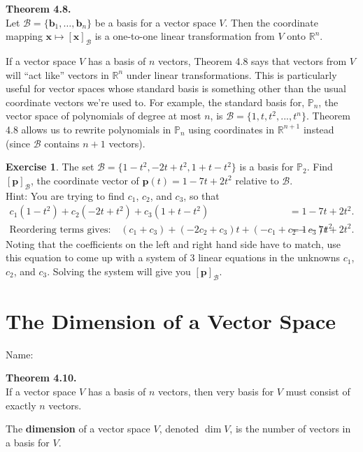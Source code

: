 \documentclass[10pt]{book}
\newcommand{\boxcolor}{gray!30}
\newenvironment{boxme}{\begin{mdframed}[backgroundcolor=\boxcolor,linewidth=0pt,nobreak=true]}{\end{mdframed}}
\newenvironment{boxthm}{\begin{mdframed}[backgroundcolor=\boxcolor,nobreak=true]}{\end{mdframed}}
\newenvironment{boxdef}{\begin{mdframed}[backgroundcolor=\boxcolor,linewidth=0pt,nobreak=true]}{\end{mdframed}}
\theoremstyle{definition}
\newtheorem{exercise}{Exercise}[section]
\newcommand{\name}[1][2.5in]{\vspace{-2.3em}\hfill Name: \underline{\hspace{#1}}}
\newcommand{\R}{\mathbb{R}}
\newcommand{\Poly}{\mathbb{P}}
\newcommand{\B}{\mathscr{B}}
\newcommand{\vect}[1]{\ensuremath{\boldsymbol{\mathbf{#1}}}}
\newcommand{\vectset}[3][v]{\{\vect{#1}_{#2},\ldots,\vect{#1}_{#3}\}}
\newcommand{\vectB}[1][x]{[\vect{#1}]_\B}
\begin{document}
\begin{boxthm}
	\textbf{Theorem 4.8.} \\
	Let $\B=\vectset[b]{1}{n}$ be a basis for a vector space $V$. Then the coordinate mapping $\vect{x}\mapsto\vectB$ is a one-to-one linear transformation from $V$ onto $\R^n$.
\end{boxthm}
\vspace{-1em}
\begin{boxme}
	If a vector space $V$ has a basis of $n$ vectors, Theorem 4.8 says that vectors from $V$ will ``act like'' vectors in $\R^n$ under linear transformations. This is particularly useful for vector spaces whose standard basis is something other than the usual coordinate vectors we're used to. For example, the standard basis for, $\Poly_n$, the vector space of polynomials of degree at most $n$, is $\B=\{1,t,t^2,...,t^n\}$. Theorem 4.8 allows us to rewrite polynomials in $\Poly_n$ using coordinates in $\R^{n+1}$ instead (since $\B$ contains $n+1$ vectors).
\end{boxme}
\begin{exercise} %
	The set $\B=\{ 1-t^2, -2t+t^2, 1+t-t^2 \}$ is a basis for $\Poly_2$. Find $\vectB[p]$, the coordinate vector of $\vect{p}(t)=1-7t+2t^2$ relative to $\B$. \\

	Hint: You are trying to find $c_1$, $c_2$, and $c_3$, so that
	\begin{align*}
	c_1(1-t^2)+c_2(-2t+t^2)+c_3(1+t-t^2) &= 1-7t+2t^2. \\
	\text{Reordering terms gives:}\quad
	(c_1+c_3) + (-2c_2+c_3)t + (-c_1+c_2-c_3)t^2 &= 1-7t+2t^2.
	\end{align*}
	Noting that the coefficients on the left and right hand side have to match, use this equation to come up with a system of 3 linear equations in the unknowns $c_1$, $c_2$, and $c_3$. Solving the system will give you $\vectB[p]$.
\end{exercise}
\vfill


\newpage


\section{The Dimension of a Vector Space}
\name[2in]


\begin{boxthm}
	\textbf{Theorem 4.10.} \\
	If a vector space $V$ has a basis of $n$ vectors, then very basis for $V$ must consist of exactly $n$ vectors.
\end{boxthm}
\vspace{-1em}
\begin{boxdef}
	The \textbf{dimension} of a vector space $V$, denoted $\dim V$, is the number of vectors in a basis for $V$.
\end{boxdef}
\end{document}
